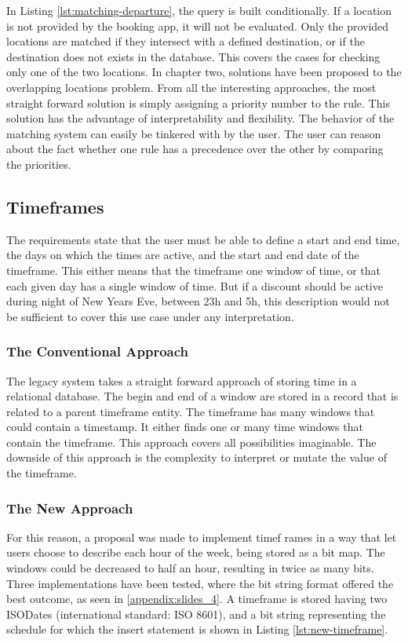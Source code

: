 In Listing \ref{lst:matching-departure}, the query is built conditionally. If a location is not provided by the booking app, it will not be evaluated. Only the provided locations are matched if they intersect with a defined destination, or if the destination does not exists in the database. This covers the cases for checking only one of the two locations. In chapter two, solutions have been proposed to the overlapping locations problem. From all the interesting approaches, the most straight forward solution is simply assigning a priority number to the rule. This solution has the advantage of interpretability and flexibility. The behavior of the matching system can easily be tinkered with by the user. The user can reason about the fact whether one rule has a precedence over the other by comparing the priorities.

\subsection{Timeframes}
The requirements state that the user must be able to define a start and end time, the days on which the times are active, and the start and end date of the timeframe. This either means that the timeframe one window of time, or that each given day has a single window of time. But if a discount should be active during night of New Years Eve, between 23h and 5h, this description would not be sufficient to cover this use case under any interpretation.

\subsubsection{The Conventional Approach}
The legacy system takes a straight forward approach of storing time in a relational database. The begin and end of a window are stored in a record that is related to a parent timeframe entity. The timeframe has many windows that could contain a timestamp. It either finds one or many time windows that contain the timeframe. This approach covers all possibilities imaginable. The downside of this approach is the complexity to interpret or mutate the value of the timeframe.

\subsubsection{The New Approach}
For this reason, a proposal was made to implement timef	rames in a way that let users choose to describe each hour of the week, being stored as a bit map. The windows could be decreased to half an hour, resulting in twice as many bits. Three implementations have been tested, where the bit string format offered the best outcome, as seen in \ref{appendix:slides_4}. A timeframe is stored having two ISODates (international standard: ISO 8601), and a bit string representing the schedule for which the insert statement is shown in Listing \ref{lst:new-timeframe}.

